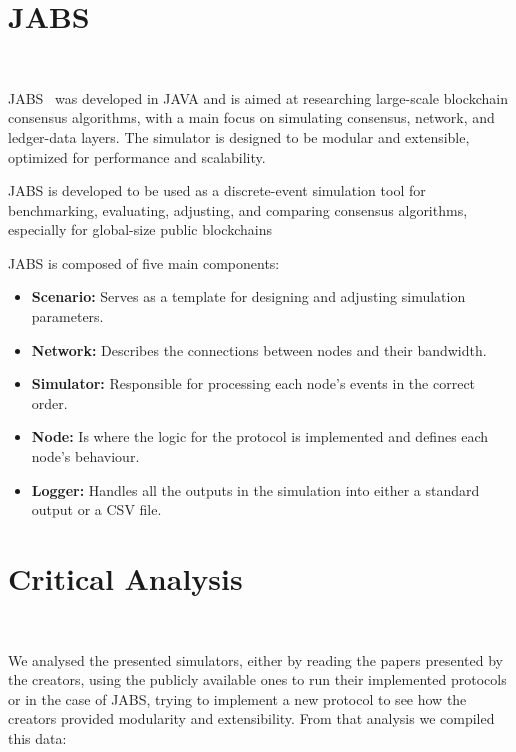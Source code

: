 \section{JABS}~\label{subsec:jabs}

JABS~\cite{jabs} was developed in JAVA and is aimed at researching large-scale blockchain consensus algorithms, with a main focus
on simulating consensus, network, and ledger-data layers. The simulator is designed to be
modular and extensible, optimized for performance and scalability.

JABS is developed to be used as a discrete-event simulation tool for benchmarking, evaluating, adjusting,
and comparing consensus algorithms, especially for global-size public blockchains

JABS is composed of five main components:

\begin{itemize}
  \item \textbf{Scenario:} Serves as a template for designing and adjusting simulation parameters.
  \item \textbf{Network:} Describes the connections between nodes and their bandwidth.
  \item \textbf{Simulator:} Responsible for processing each node's events in the correct order.
  \item \textbf{Node:} Is where the logic for the protocol is implemented and defines each node's
  behaviour.
  \item \textbf{Logger:} Handles all the outputs in the simulation into either a standard output or
  a CSV file.
\end{itemize}


\section{Critical Analysis}~\label{subsec:critical_analysis}

We analysed the presented simulators, either by reading the papers presented by the creators,
using the publicly available ones to run their implemented protocols or in the case of JABS, trying to
implement a new protocol to see how the creators provided modularity and extensibility. From that
analysis we compiled this data:

